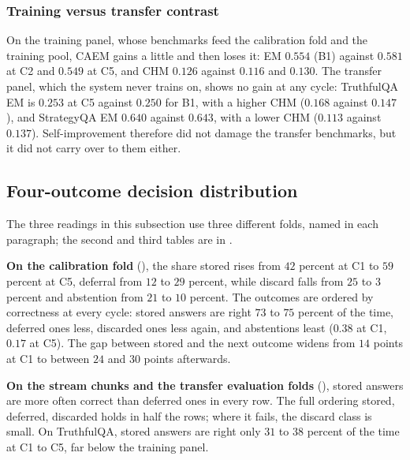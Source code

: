



\FloatBarrier

\subsubsection{Training versus transfer contrast}
\label{sec:headline-id-vs-transfer}

On the training panel, whose benchmarks feed the calibration fold and the training pool, CAEM gains a little and then loses it: EM $0.554$ (B1) against $0.581$ at C2 and $0.549$ at C5, and CHM $0.126$ against $0.116$ and $0.130$. The transfer panel, which the system never trains on, shows no gain at any cycle: TruthfulQA EM is $0.253$ at C5 against $0.250$ for B1, with a higher CHM ($0.168$ against $0.147$), and StrategyQA EM $0.640$ against $0.643$, with a lower CHM ($0.113$ against $0.137$). Self-improvement therefore did not damage the transfer benchmarks, but it did not carry over to them either.

\subsection{Four-outcome decision distribution}
\label{sec:decision-distribution}

The three readings in this subsection use three different folds, named in each paragraph; the second and third tables are in .

\textbf{On the calibration fold} (), the share stored rises from $42$ percent at C1 to $59$ percent at C5, deferral from $12$ to $29$ percent, while discard falls from $25$ to $3$ percent and abstention from $21$ to $10$ percent. The outcomes are ordered by correctness at every cycle: stored answers are right $73$ to $75$ percent of the time, deferred ones less, discarded ones less again, and abstentions least ($0.38$ at C1, $0.17$ at C5). The gap between stored and the next outcome widens from $14$ points at C1 to between $24$ and $30$ points afterwards.



\textbf{On the stream chunks and the transfer evaluation folds} (), stored answers are more often correct than deferred ones in every row. The full ordering stored, deferred, discarded holds in half the rows; where it fails, the discard class is small. On TruthfulQA, stored answers are right only $31$ to $38$ percent of the time at C1 to C5, far below the training panel.

